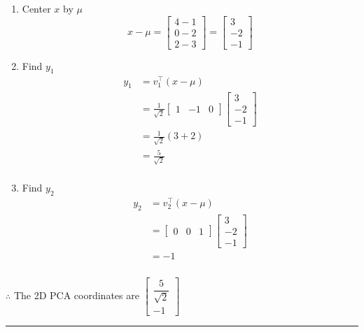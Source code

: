 \documentclass{article}
\begin{document}
{\begin{enumerate}
  \item Center $x$ by $\mu$
  $$x-\mu=\begin{bmatrix}4-1 \\ 0-2 \\ 2-3\end{bmatrix}=\begin{bmatrix}3 \\ -2 \\ -1\end{bmatrix}$$
  \item Find $y_1$
  \begin{align*}
    y_1 &= v_1^\top (x-\mu) \\
    &= \frac{1}{\sqrt{2}}\begin{bmatrix}1 & -1 & 0\end{bmatrix}\begin{bmatrix}3 \\ -2 \\ -1\end{bmatrix} \\
    &= \frac{1}{\sqrt{2}}(3+2) \\
    &= \frac{5}{\sqrt{2}} \\
  \end{align*}
  \item Find $y_2$
  \begin{align*}
    y_2 &= v_2^\top (x-\mu) \\
    &= \begin{bmatrix}0 & 0 & 1\end{bmatrix}\begin{bmatrix}3 \\ -2 \\ -1\end{bmatrix} \\
    &= -1
  \end{align*}
\end{enumerate}

\subsubsection*{\normalfont}{$\therefore$ The 2D PCA coordinates are $\begin{bmatrix}\dfrac{5}{\sqrt{2}} \\[10pt] -1\end{bmatrix}$}

\noindent\rule{\textwidth}{0.4pt}\\

}
\end{document}
